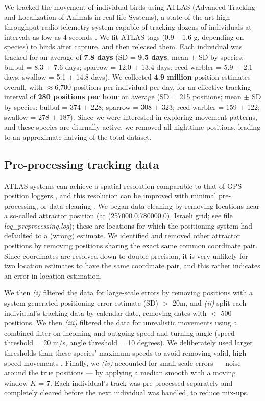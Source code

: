 \begin{refsection}
We tracked the movement of individual birds using ATLAS (Advanced Tracking and Localization of Animals in real-life Systems), a state-of-the-art high-throughput radio-telemetry system capable of tracking dozens of individuals at intervals as low as 4 seconds \citep{weiser2016,toledo2014,toledo2020,nathan2022}.
We fit ATLAS tags (0.9 -- 1.6 g, depending on species) to birds after capture, and then released them.
Each individual was tracked for an average of \textbf{7.8 days} (SD = \textbf{9.5 days}; mean $\pm$ SD by species:  bulbul = 8.3 $\pm$ 7.6 days; sparrow = 12.0 $\pm$ 13.4 days; reed-warbler = 5.9 $\pm$ 2.1 days; swallow = 5.1 $\pm$ 14.8 days).
We collected \textbf{4.9 million} position estimates overall, with $\approx$6,700 positions per individual per day, for an effective tracking interval of \textbf{280 positions per hour} on average (SD = 215 positions; mean $\pm$ SD by species:  bulbul = 374 $\pm$ 228; sparrow = 308 $\pm$ 323; reed warbler = 159 $\pm$ 122; swallow = 278 $\pm$ 187).
Since we were interested in exploring movement patterns, and these species are diurnally active, we removed all nighttime positions, leading to an approximate halving of the total dataset.

\subsection*{Pre-processing tracking data}

ATLAS systems can achieve a spatial resolution comparable to that of GPS position loggers \citep{weiser2016,beardsworth2021}, and this resolution can be improved with minimal pre-processing, or data cleaning \citep{beardsworth2021, gupte2022d}.
We began data cleaning by removing locations near a so-called attractor position (at (257000.0,780000.0), Israeli grid; see file \textit{log\_preprocessing.log}); these are locations for which the positioning system had defaulted to a (wrong) estimate.
We identified and removed other attractor positions by removing positions sharing the exact same common coordinate pair. 
Since coordinates are resolved down to double-precision, it is very unlikely for two location estimates to have the same coordinate pair, and this rather indicates an error in location estimation.

We then \textit{(i)} filtered the data for large-scale errors by removing positions with a system-generated positioning-error estimate (SD) $>$ 20m, and \textit{(ii)} split each individual's tracking data by calendar date, removing dates with $<$ 500 positions. We then \textit{(iii)} filtered the data for unrealistic movements using a combined filter on incoming and outgoing speed and turning angle (speed threshold = 20 m/s, angle threshold = 10 degrees).
We deliberately used larger thresholds than these species' maximum speeds to avoid removing valid, high-speed movements \citep{gupte2022d}.
Finally, we \textit{(iv)} accounted for small-scale errors --- noise around the true positions --- by applying a median smooth with a moving window $K$ = 7.
Each individual's track was pre-processed separately and completely cleared before the next individual was handled, to reduce mix-ups.


\end{refsection}

